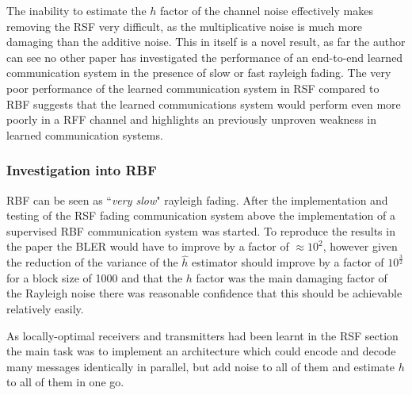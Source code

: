 \documentclass[12pt,onecolumn,letterpaper]{article}
\begin{document}
The inability to estimate the $h$ factor of the channel noise effectively makes removing the RSF very difficult, as the multiplicative noise is much more damaging than the additive noise. This in itself is a novel result, as far the author can see no other paper has investigated the performance of an end-to-end learned communication system in the presence of slow or fast rayleigh fading. The very poor performance of the learned communication system in RSF compared to RBF suggests that the learned communications system would perform even more poorly in a RFF channel and highlights an previously unproven weakness in learned communication systems.

\subsubsection{Investigation into RBF}

RBF can be seen as ``\textit{very slow}" rayleigh fading. After the implementation and testing of the RSF fading communication system above the implementation of a supervised RBF communication system was started. To reproduce the results in the paper the BLER would have to improve by a factor of $\approx10^2$, however given the reduction of the variance of the $\hat{h}$ estimator should improve by a factor of $10^{\frac{3}{2}}$ for a block size of 1000 and that the $h$ factor was the main damaging factor of the Rayleigh noise there was reasonable confidence that this should be achievable relatively easily. 

As locally-optimal receivers and transmitters had been learnt in the RSF section the main task was to implement an architecture which could encode and decode many messages identically in parallel, but add noise to all of them and estimate $h$ to all of them in one go.
\end{document}
